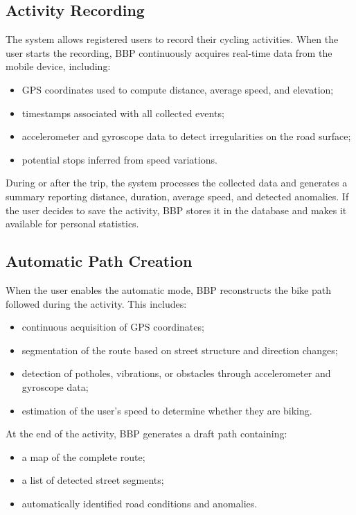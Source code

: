 \subsection*{Activity Recording}
The system allows registered users to record their cycling activities. When the user starts the recording, BBP continuously acquires real-time data from the mobile device, including:
\begin{itemize}
    \item GPS coordinates used to compute distance, average speed, and elevation;
    \item timestamps associated with all collected events;
    \item accelerometer and gyroscope data to detect irregularities on the road surface;
    \item potential stops inferred from speed variations.
\end{itemize}

During or after the trip, the system processes the collected data and generates a summary reporting distance, duration, average speed, and detected anomalies. If the user decides to save the activity, BBP stores it in the database and makes it available for personal statistics.

\subsection*{Automatic Path Creation}

When the user enables the automatic mode, BBP reconstructs the bike path followed during the activity. This includes:
\begin{itemize}
    \item continuous acquisition of GPS coordinates;
    \item segmentation of the route based on street structure and direction changes;
    \item detection of potholes, vibrations, or obstacles through accelerometer and gyroscope data;
    \item estimation of the user's speed to determine whether they are biking.
\end{itemize}

At the end of the activity, BBP generates a draft path containing:
\begin{itemize}
    \item a map of the complete route;
    \item a list of detected street segments;
    \item automatically identified road conditions and anomalies.
\end{itemize}

